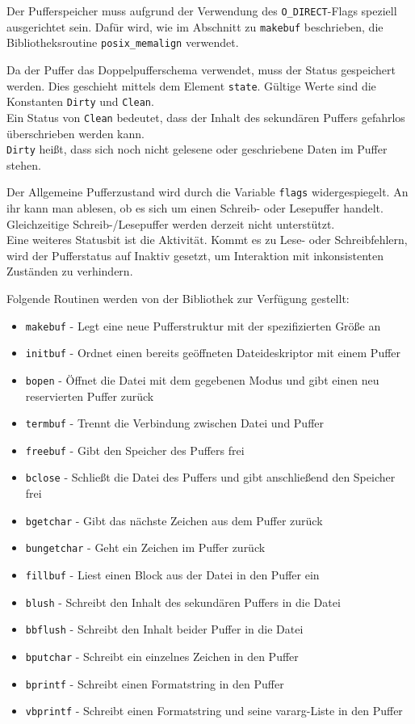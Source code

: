Der Pufferspeicher muss aufgrund der Verwendung des \texttt{O\_DIRECT}-Flags speziell ausgerichtet sein.
Dafür wird, wie im Abschnitt zu \texttt{makebuf} beschrieben,
die Bibliotheksroutine \texttt{posix\_memalign} verwendet.

Da der Puffer das Doppelpufferschema verwendet,
muss der Status gespeichert werden.
Dies geschieht mittels dem Element \texttt{state}.
Gültige Werte sind die Konstanten \texttt{Dirty} und \texttt{Clean}. \\
Ein Status von \texttt{Clean} bedeutet,
dass der Inhalt des sekundären Puffers gefahrlos überschrieben werden kann. \\
\texttt{Dirty} heißt, dass sich noch nicht gelesene oder geschriebene Daten im Puffer stehen.

Der Allgemeine Pufferzustand wird durch die Variable \texttt{flags} widergespiegelt.
An ihr kann man ablesen,
ob es sich um einen Schreib- oder Lesepuffer handelt.
Gleichzeitige Schreib-/Lesepuffer werden derzeit nicht unterstützt. \\
Eine weiteres Statusbit ist die Aktivität.
Kommt es zu Lese- oder Schreibfehlern,
wird der Pufferstatus auf Inaktiv gesetzt,
um Interaktion mit inkonsistenten Zuständen zu verhindern.

Folgende Routinen werden von der Bibliothek zur Verfügung gestellt:

\begin{itemize}
\item \texttt{makebuf} - Legt eine neue Pufferstruktur mit der spezifizierten Größe an
\item \texttt{initbuf} - Ordnet einen bereits geöffneten Dateideskriptor mit einem Puffer
\item \texttt{bopen} - Öffnet die Datei mit dem gegebenen Modus und gibt einen neu reservierten Puffer zurück
\item \texttt{termbuf} - Trennt die Verbindung zwischen Datei und Puffer
\item \texttt{freebuf} - Gibt den Speicher des Puffers frei
\item \texttt{bclose} - Schließt die Datei des Puffers und gibt anschließend den Speicher frei
\item \texttt{bgetchar} - Gibt das nächste Zeichen aus dem Puffer zurück
\item \texttt{bungetchar} - Geht ein Zeichen im Puffer zurück
\item \texttt{fillbuf} - Liest einen Block aus der Datei in den Puffer ein
\item \texttt{blush} - Schreibt den Inhalt des sekundären Puffers in die Datei
\item \texttt{bbflush} - Schreibt den Inhalt beider Puffer in die Datei
\item \texttt{bputchar} - Schreibt ein einzelnes Zeichen in den Puffer
\item \texttt{bprintf} - Schreibt einen Formatstring in den Puffer
\item \texttt{vbprintf} - Schreibt einen Formatstring und seine vararg-Liste in den Puffer
\end{itemize}

